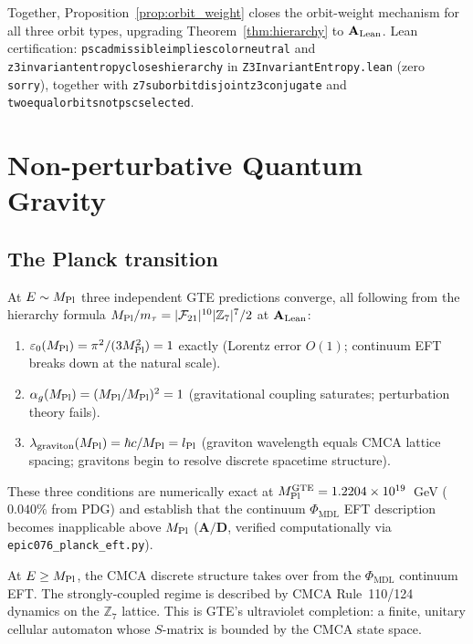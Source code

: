 \documentclass[11pt]{article}
\theoremstyle{remark}
\newcommand{\PHIMDL}{\Phi_{\mathrm{MDL}}}
\newcommand{\ZS}{\mathbb{Z}_7}
\newcommand{\lean}[1]{%
  \penalty-100
  \begingroup\def\_{\textunderscore\allowbreak}\texttt{#1}\endgroup}
\newcommand{\epsz}{\varepsilon_0}
\newcommand{\FTT}{\mathcal{F}_{21}}
\newcommand{\CatAL}{\ensuremath{\textbf{A}_{\rm Lean}}}
\newcommand{\CatAD}{\textbf{A/D}}
\begin{document}
\noindent
Together, Proposition~\ref{prop:orbit_weight} closes the orbit-weight
mechanism for all three orbit types, upgrading
Theorem~\ref{thm:hierarchy} to $\CatAL$.
Lean certification: \lean{psc\_admissible\_implies\_color\_neutral} and
\lean{z3\_invariant\_entropy\_closes\_hierarchy} in
\lean{Z3InvariantEntropy.lean} (zero \texttt{sorry}), together with
\lean{z7\_suborbit\_disjoint\_z3\_conjugate} and
\lean{two\_equal\_orbits\_not\_psc\_selected}.

\section{Non-perturbative Quantum Gravity}
\label{sec:npg}

\subsection{The Planck transition}

At $E\sim M_{\rm Pl}$ three independent GTE predictions converge, all following
from the hierarchy formula $M_{\rm Pl}/m_\tau=|\FTT|^{10}|\ZS|^7/2$ at $\CatAL$:
\begin{enumerate}[noitemsep]
\item $\epsz(M_{\rm Pl})=\pi^2/(3M_{\rm Pl}^2)=1$ exactly (Lorentz error $O(1)$;
  continuum EFT breaks down at the natural scale).
\item $\alpha_g(M_{\rm Pl})=(M_{\rm Pl}/M_{\rm Pl})^2=1$ (gravitational coupling
  saturates; perturbation theory fails).
\item $\lambda_{\rm graviton}(M_{\rm Pl})=\hbar c/M_{\rm Pl}=l_{\rm Pl}$ (graviton
  wavelength equals CMCA lattice spacing; gravitons begin to resolve discrete
  spacetime structure).
\end{enumerate}
These three conditions are numerically exact at $M_{\rm Pl}^{\rm GTE}
=1.2204\times10^{19}$~GeV ($0.040\%$ from PDG) and establish that the
continuum $\PHIMDL$ EFT description becomes inapplicable above $M_{\rm Pl}$
($\CatAD$, verified computationally via \texttt{epic076\_planck\_eft.py}).

At $E\geq M_{\rm Pl}$, the CMCA discrete structure takes over from the
$\PHIMDL$ continuum EFT.  The strongly-coupled regime is described by CMCA
Rule~110/124 dynamics on the $\ZS$ lattice.  This is GTE's ultraviolet
completion: a finite, unitary cellular automaton whose $S$-matrix is bounded
by the CMCA state space.
\end{document}
